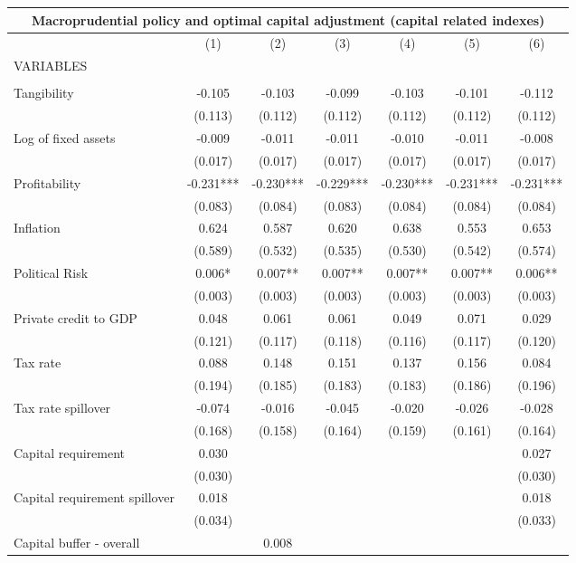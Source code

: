 \begin{tabular}{lcccccc}
\multicolumn{7}{c}{Macroprudential policy and optimal capital adjustment (capital related indexes)} \\ \hline
 & (1) & (2) & (3) & (4) & (5) & (6) \\
VARIABLES &  &  &  &  &  &  \\ \hline
 &  &  &  &  &  &  \\
Tangibility & -0.105 & -0.103 & -0.099 & -0.103 & -0.101 & -0.112 \\
 & (0.113) & (0.112) & (0.112) & (0.112) & (0.112) & (0.112) \\
Log of fixed assets & -0.009 & -0.011 & -0.011 & -0.010 & -0.011 & -0.008 \\
 & (0.017) & (0.017) & (0.017) & (0.017) & (0.017) & (0.017) \\
Profitability & -0.231*** & -0.230*** & -0.229*** & -0.230*** & -0.231*** & -0.231*** \\
 & (0.083) & (0.084) & (0.083) & (0.084) & (0.084) & (0.084) \\
Inflation & 0.624 & 0.587 & 0.620 & 0.638 & 0.553 & 0.653 \\
 & (0.589) & (0.532) & (0.535) & (0.530) & (0.542) & (0.574) \\
Political Risk & 0.006* & 0.007** & 0.007** & 0.007** & 0.007** & 0.006** \\
 & (0.003) & (0.003) & (0.003) & (0.003) & (0.003) & (0.003) \\
Private credit to GDP & 0.048 & 0.061 & 0.061 & 0.049 & 0.071 & 0.029 \\
 & (0.121) & (0.117) & (0.118) & (0.116) & (0.117) & (0.120) \\
Tax rate & 0.088 & 0.148 & 0.151 & 0.137 & 0.156 & 0.084 \\
 & (0.194) & (0.185) & (0.183) & (0.183) & (0.186) & (0.196) \\
Tax rate spillover & -0.074 & -0.016 & -0.045 & -0.020 & -0.026 & -0.028 \\
 & (0.168) & (0.158) & (0.164) & (0.159) & (0.161) & (0.164) \\
Capital requirement & 0.030 &  &  &  &  & 0.027 \\
 & (0.030) &  &  &  &  & (0.030) \\
Capital requirement spillover & 0.018 &  &  &  &  & 0.018 \\
 & (0.034) &  &  &  &  & (0.033) \\
Capital buffer - overall &  & 0.008 &  &  &  &  \\

\end{tabular}
